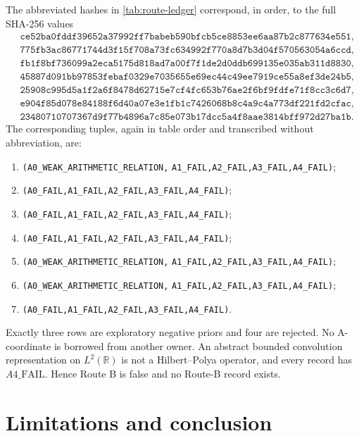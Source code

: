 \documentclass[11pt]{article}
\theoremstyle{definition}
\newcommand{\R}{\mathbb R}
\begin{document}
The abbreviated hashes in \cref{tab:route-ledger} correspond, in order, to
the full SHA-256 values
\begin{align*}
&\texttt{ce52ba0fddf39652a37992ff7babeb590bfcb5ce8853ee6aa87b2c877634e551},\\
&\texttt{775fb3ac86771744d3f15f708a73fc634992f770a8d7b3d04f570563054a6ccd},\\
&\texttt{fb1f8bf736099a2eca5175d818ad7a00f7f1de2d0ddb699135e035ab311d8830},\\
&\texttt{45887d091bb97853febaf0329e7035655e69ec44c49ee7919ce55a8ef3de24b5},\\
&\texttt{25908c995d5a1f2a6f8478d62715e7cf4fc653b76ae2f6bf9fdfe71f8cc3c6d7},\\
&\texttt{e904f85d078e84188f6d40a07e3e1fb1c7426068b8c4a9c4a773df221fd2cfac},\\
&\texttt{23480710707367d9f77b4896a7c85e073b17dcc5a4f8aae3814bff972d27ba1b}.
\end{align*}
The corresponding tuples, again in table order and transcribed without
abbreviation, are:
\begin{enumerate}[leftmargin=2.5em]
\item \texttt{(A0\_WEAK\_ARITHMETIC\_RELATION,}\newline
  \texttt{A1\_FAIL,A2\_FAIL,A3\_FAIL,A4\_FAIL)};
\item \texttt{(A0\_FAIL,A1\_FAIL,A2\_FAIL,A3\_FAIL,A4\_FAIL)};
\item \texttt{(A0\_FAIL,A1\_FAIL,A2\_FAIL,A3\_FAIL,A4\_FAIL)};
\item \texttt{(A0\_FAIL,A1\_FAIL,A2\_FAIL,A3\_FAIL,A4\_FAIL)};
\item \texttt{(A0\_WEAK\_ARITHMETIC\_RELATION,}\newline
  \texttt{A1\_FAIL,A2\_FAIL,A3\_FAIL,A4\_FAIL)};
\item \texttt{(A0\_WEAK\_ARITHMETIC\_RELATION,}\newline
  \texttt{A1\_FAIL,A2\_FAIL,A3\_FAIL,A4\_FAIL)};
\item \texttt{(A0\_FAIL,A1\_FAIL,A2\_FAIL,A3\_FAIL,A4\_FAIL)}.
\end{enumerate}
Exactly three rows are exploratory negative priors and four are rejected.
No A-coordinate is borrowed from another owner.  An abstract bounded
convolution representation on $L^2(\R)$ is not a Hilbert--Polya operator,
and every record has $A4\_\mathrm{FAIL}$.  Hence Route B is false and no
Route-B record exists.

\section{Limitations and conclusion}
\label{sec:conclusion}
\end{document}
